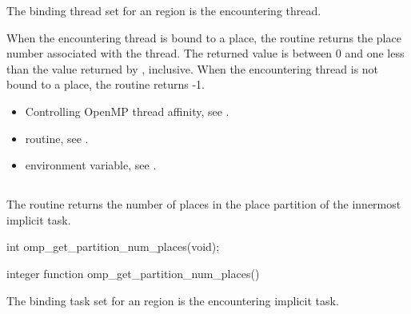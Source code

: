 \binding
The binding thread set for an  region is the encountering thread.

\effect
When the encountering thread is bound to a place, the 
 routine returns the place number associated 
with the thread. The returned value is between 0 and one less than the 
value returned by , inclusive. When the 
encountering thread is not bound to a place, the routine returns -1.

\crossreferences
\begin{itemize}
\item Controlling OpenMP thread affinity, see 
. 

\item {} routine, see 
.

\item {} environment variable, see 
.
\end{itemize}





\subsection{}
\label{subsec:omp_get_partition_num_places}

\summary
The  routine returns the number of places in the place partition of the innermost implicit task.

\format
\begin{ccppspecific}
\begin{boxedcode}
int omp\_get\_partition\_num\_places(void);
\end{boxedcode}
\end{ccppspecific}

\begin{fortranspecific}
\begin{boxedcode}
integer function omp\_get\_partition\_num\_places()
\end{boxedcode}
\end{fortranspecific}

\binding
The binding task set for an   region is the encountering implicit task.

